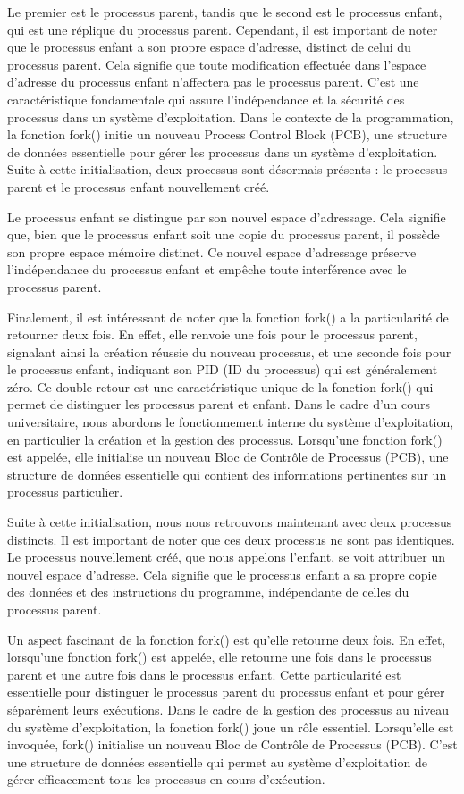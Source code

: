 \documentclass[12pt]{article}
\begin{document}
Le premier est le processus parent, tandis que le second est le processus enfant, qui est une réplique du processus parent. Cependant, il est important de noter que le processus enfant a son propre espace d'adresse, distinct de celui du processus parent. Cela signifie que toute modification effectuée dans l'espace d'adresse du processus enfant n'affectera pas le processus parent. C'est une caractéristique fondamentale qui assure l'indépendance et la sécurité des processus dans un système d'exploitation.
Dans le contexte de la programmation, la fonction fork() initie un nouveau Process Control Block (PCB), une structure de données essentielle pour gérer les processus dans un système d'exploitation. Suite à cette initialisation, deux processus sont désormais présents : le processus parent et le processus enfant nouvellement créé.

Le processus enfant se distingue par son nouvel espace d'adressage. Cela signifie que, bien que le processus enfant soit une copie du processus parent, il possède son propre espace mémoire distinct. Ce nouvel espace d'adressage préserve l'indépendance du processus enfant et empêche toute interférence avec le processus parent.

Finalement, il est intéressant de noter que la fonction fork() a la particularité de retourner deux fois. En effet, elle renvoie une fois pour le processus parent, signalant ainsi la création réussie du nouveau processus, et une seconde fois pour le processus enfant, indiquant son PID (ID du processus) qui est généralement zéro. Ce double retour est une caractéristique unique de la fonction fork() qui permet de distinguer les processus parent et enfant.
Dans le cadre d'un cours universitaire, nous abordons le fonctionnement interne du système d'exploitation, en particulier la création et la gestion des processus. Lorsqu'une fonction fork() est appelée, elle initialise un nouveau Bloc de Contrôle de Processus (PCB), une structure de données essentielle qui contient des informations pertinentes sur un processus particulier.

Suite à cette initialisation, nous nous retrouvons maintenant avec deux processus distincts. Il est important de noter que ces deux processus ne sont pas identiques. Le processus nouvellement créé, que nous appelons l'enfant, se voit attribuer un nouvel espace d'adresse. Cela signifie que le processus enfant a sa propre copie des données et des instructions du programme, indépendante de celles du processus parent.

Un aspect fascinant de la fonction fork() est qu'elle retourne deux fois. En effet, lorsqu'une fonction fork() est appelée, elle retourne une fois dans le processus parent et une autre fois dans le processus enfant. Cette particularité est essentielle pour distinguer le processus parent du processus enfant et pour gérer séparément leurs exécutions.
Dans le cadre de la gestion des processus au niveau du système d'exploitation, la fonction fork() joue un rôle essentiel. Lorsqu'elle est invoquée, fork() initialise un nouveau Bloc de Contrôle de Processus (PCB). C'est une structure de données essentielle qui permet au système d'exploitation de gérer efficacement tous les processus en cours d'exécution.
\end{document}
